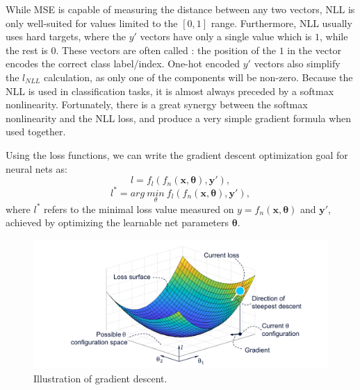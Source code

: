 			\noindent While \ac{MSE} is capable of measuring the distance between any two vectors, \ac{NLL} is only well-suited for values limited to the $[0,1]$ range.
			Furthermore, \ac{NLL} usually uses hard targets, where the $y'$ vectors have only a single value which is $1$, while the rest is $0$.
			These vectors are often called : the position of the $1$ in the vector encodes the correct class label/index.
			One-hot encoded $y'$ vectors also simplify the $l_{NLL}$ calculation, as only one of the components will be non-zero.
			Because the \ac{NLL} is used in classification tasks, it is almost always preceded by a softmax nonlinearity.
			Fortunately, there is a great synergy between the softmax nonlinearity and the \ac{NLL} loss, and produce a very simple gradient formula when used together.		
			
			Using the loss functions, we can write the gradient descent optimization goal for neural nets as:
			\begin{equation}
				\label{eq:gradient_descent_loss}
				l = f_l(f_n(\mathbf{x}, \mathbf{\theta}), \mathbf{y}'),
			\end{equation}
			\begin{equation}
				\label{eq:gradient_descent_goal}
				l^* = arg\:\underset{\theta}{min}\:f_l(f_n(\mathbf{x}, \mathbf{\theta}), \mathbf{y}'),
			\end{equation}
			\noindent where $l^*$ refers to the minimal loss value measured on $y = f_n(\mathbf{x}, \mathbf{\theta})$ and $\mathbf{y}'$, achieved by optimizing the learnable net parameters $\mathbf{\theta}$.
			
			\begin{figure}[ht]
				\centering
				\includegraphics[width=\linewidth]{figures/02_deep_learning/gradient_descent/gradient_descent.pdf}
				\caption[Gradient descent illustration]{Illustration of gradient descent.}
				\label{fig:gradient_descent}
			\end{figure}
			
